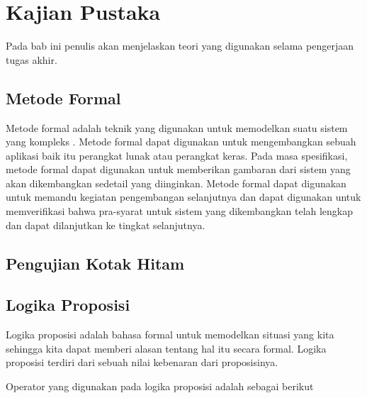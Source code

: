 \chapter{Kajian Pustaka}

Pada bab ini penulis akan menjelaskan teori yang digunakan selama pengerjaan tugas akhir.

\section{Metode Formal}

Metode formal adalah teknik yang digunakan untuk memodelkan suatu
sistem yang kompleks \cite{huth2004logic}. Metode formal dapat digunakan untuk mengembangkan
sebuah aplikasi baik itu perangkat lunak atau perangkat keras. Pada
masa spesifikasi, metode formal dapat digunakan untuk memberikan gambaran
dari sistem yang akan dikembangkan sedetail yang diinginkan. Metode
formal dapat digunakan untuk memandu kegiatan pengembangan selanjutnya
dan dapat digunakan untuk memverifikasi bahwa pra-syarat untuk sistem yang
dikembangkan telah lengkap dan dapat dilanjutkan ke tingkat selanjutnya.

\section{Pengujian Kotak Hitam}

\section{Logika Proposisi}

Logika proposisi adalah bahasa formal untuk memodelkan situasi yang kita sehingga kita dapat memberi alasan tentang hal itu secara formal. Logika proposisi terdiri dari sebuah nilai kebenaran dari proposisinya.

Operator yang digunakan pada logika proposisi adalah sebagai berikut

